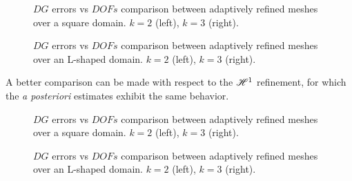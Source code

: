 \begin{figure}[!ht]
	\begin{subfigure}[b]{0.45\textwidth}
		
	\end{subfigure}
	\hfill
	\begin{subfigure}[b]{0.45\textwidth}
		
	\end{subfigure}
    \caption{$DG$ errors vs $DOFs$ comparison between adaptively refined meshes over a square domain. $k = 2$ (left), $k = 3$ (right).}
\end{figure}

\begin{figure}[!ht]
	\begin{subfigure}[b]{0.45\textwidth}
		
	\end{subfigure}
	\hfill
	\begin{subfigure}[b]{0.45\textwidth}
	\end{subfigure}
    \caption{$DG$ errors vs $DOFs$ comparison between adaptively refined meshes over an L-shaped domain. $k = 2$ (left), $k = 3$ (right).}
\end{figure}

\newpage

A better comparison can be made with respect to the $\mathscr{H}^1$ refinement, for which the \textit{a posteriori} estimates exhibit the same behavior.

\begin{figure}[!ht]
	\begin{subfigure}[b]{0.45\textwidth}
		
	\end{subfigure}
	\hfill
	\begin{subfigure}[b]{0.45\textwidth}
		
	\end{subfigure}
    \caption{$DG$ errors vs $DOFs$ comparison between adaptively refined meshes over a square domain. $k = 2$ (left), $k = 3$ (right).}
\end{figure}

\begin{figure}[!ht]
	\begin{subfigure}[b]{0.45\textwidth}
		
	\end{subfigure}
	\hfill
	\begin{subfigure}[b]{0.45\textwidth}
	\end{subfigure}
    \caption{$DG$ errors vs $DOFs$ comparison between adaptively refined meshes over an L-shaped domain. $k = 2$ (left), $k = 3$ (right).}
\end{figure}


